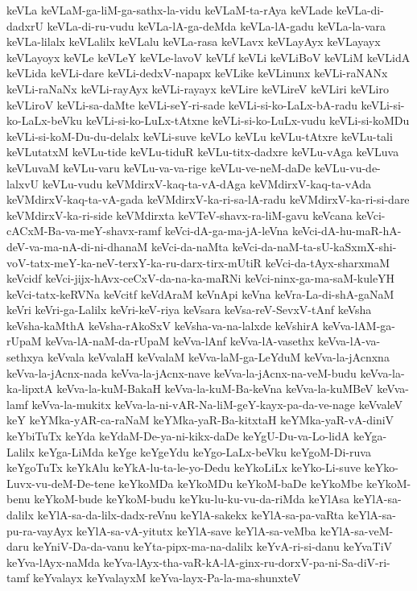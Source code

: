 {keVLa
keVLaM-ga-liM-ga-sathx-la-vidu
keVLaM-ta-rAya
keVLade
keVLa-di-dadxrU
keVLa-di-ru-vudu
keVLa-lA-ga-deMda
keVLa-lA-gadu
keVLa-la-vara
keVLa-lilalx
keVLalilx
keVLalu
keVLa-rasa
keVLavx
keVLayAyx
keVLayayx
keVLayoyx
keVLe
keVLeY
keVLe-lavoV
keVLf
keVLi
keVLiBoV
keVLiM
keVLidA
keVLida
keVLi-dare
keVLi-dedxV-napapx
keVLike
keVLinunx
keVLi-raNANx
keVLi-raNaNx
keVLi-rayAyx
keVLi-rayayx
keVLire
keVLireV
keVLiri
keVLiro
keVLiroV
keVLi-sa-daMte
keVLi-seY-ri-sade
keVLi-si-ko-LaLx-bA-radu
keVLi-si-ko-LaLx-beVku
keVLi-si-ko-LuLx-tAtxne
keVLi-si-ko-LuLx-vudu
keVLi-si-koMDu
keVLi-si-koM-Du-du-delalx
keVLi-suve
keVLo
keVLu
keVLu-tAtxre
keVLu-tali
keVLutatxM
keVLu-tide
keVLu-tiduR
keVLu-titx-dadxre
keVLu-vAga
keVLuva
keVLuvaM
keVLu-varu
keVLu-va-va-rige
keVLu-ve-neM-daDe
keVLu-vu-de-lalxvU
keVLu-vudu
keVMdirxV-kaq-ta-vA-dAga
keVMdirxV-kaq-ta-vAda
keVMdirxV-kaq-ta-vA-gada
keVMdirxV-ka-ri-sa-lA-radu
keVMdirxV-ka-ri-si-dare
keVMdirxV-ka-ri-side
keVMdirxta
keVTeV-shavx-ra-liM-gavu
keVcana
keVci-cACxM-Ba-va-meY-shavx-ramf
keVci-dA-ga-ma-jA-leVna
keVci-dA-hu-maR-hA-deV-va-ma-nA-di-ni-dhanaM
keVci-da-naMta
keVci-da-naM-ta-sU-kaSxmX-shi-voV-tatx-meY-ka-neV-terxY-ka-ru-darx-tirx-mUtiR
keVci-da-tAyx-sharxmaM
keVcidf
keVci-jijx-hAvx-ceCxV-da-na-ka-maRNi
keVci-ninx-ga-ma-saM-kuleYH
keVci-tatx-keRVNa
keVcitf
keVdAraM
keVnApi
keVna
keVra-La-di-shA-gaNaM
keVri
keVri-ga-Lalilx
keVri-keV-riya
keVsara
keVsa-reV-SevxV-tAnf
keVsha
keVsha-kaMthA
keVsha-rAkoSxV
keVsha-va-na-lalxde
keVshirA
keVva-lAM-ga-rUpaM
keVva-lA-naM-da-rUpaM
keVva-lAnf
keVva-lA-vasethx
keVva-lA-va-sethxya
keVvala
keVvalaH
keVvalaM
keVva-laM-ga-LeYduM
keVva-la-jAcnxna
keVva-la-jAcnx-nada
keVva-la-jAcnx-nave
keVva-la-jAcnx-na-veM-budu
keVva-la-ka-lipxtA
keVva-la-kuM-BakaH
keVva-la-kuM-Ba-keVna
keVva-la-kuMBeV
keVva-lamf
keVva-la-mukitx
keVva-la-ni-vAR-Na-liM-geY-kayx-pa-da-ve-nage
keVvaleV
keY
keYMka-yAR-ca-raNaM
keYMka-yaR-Ba-kitxtaH
keYMka-yaR-vA-diniV
keYbiTuTx
keYda
keYdaM-De-ya-ni-kikx-daDe
keYgU-Du-va-Lo-lidA
keYga-Lalilx
keYga-LiMda
keYge
keYgeYdu
keYgo-LaLx-beVku
keYgoM-Di-ruva
keYgoTuTx
keYkAlu
keYkA-lu-ta-le-yo-Dedu
keYkoLiLx
keYko-Li-suve
keYko-Luvx-vu-deM-De-tene
keYkoMDa
keYkoMDu
keYkoM-baDe
keYkoMbe
keYkoM-benu
keYkoM-bude
keYkoM-budu
keYku-lu-ku-vu-da-riMda
keYlAsa
keYlA-sa-dalilx
keYlA-sa-da-lilx-dadx-reVnu
keYlA-sakekx
keYlA-sa-pa-vaRta
keYlA-sa-pu-ra-vayAyx
keYlA-sa-vA-yitutx
keYlA-save
keYlA-sa-veMba
keYlA-sa-veM-daru
keYniV-Da-da-vanu
keYta-pipx-ma-na-dalilx
keYvA-ri-si-danu
keYvaTiV
keYva-lAyx-naMda
keYva-lAyx-tha-vaR-kA-lA-ginx-ru-dorxV-pa-ni-Sa-diV-ri-tamf
keYvalayx
keYvalayxM
keYva-layx-Pa-la-ma-shunxteV
}
